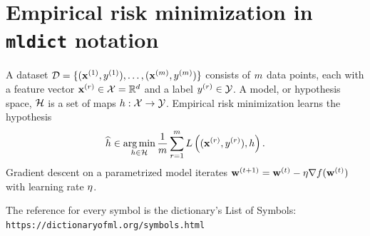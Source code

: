 \documentclass{article}
\begin{document}
\section*{Empirical risk minimization in \texttt{mldict} notation}

A dataset $\mathcal{D} = \{ ({\bf x}^{(1)}, y^{(1)}), \ldots,
({\bf x}^{(m)}, y^{(m)}) \}$ consists of
$m$ data points, each with a feature vector
${\bf x}^{(r)} \in \mathcal{X} = \mathbb{R}^{d}$ and a
label $y^{(r)} \in \mathcal{Y}$. A model, or hypothesis
space, $\mathcal{H}$ is a set of maps
$h: \mathcal{X} \to \mathcal{Y}$. Empirical risk minimization
learns the hypothesis
\[
  \widehat{h} \in \operatorname*{arg\,min}_{h \in \mathcal{H}}
  \frac{1}{m} \sum_{r=1}^{m}
  L\left(({\bf x}^{(r)}, y^{(r)}),h \right)
  \text{.}
\]
Gradient descent on a parametrized model iterates
${\bf w}^{(t+1)} = {\bf w}^{(t)} - \eta \nabla
f({\bf w}^{(t)})$ with learning rate $\eta$.

The reference for every symbol is the dictionary's List of Symbols:
\texttt{https://dictionaryofml.org/symbols.html}
\end{document}
